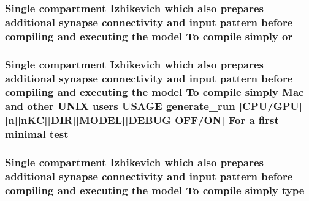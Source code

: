 \hypertarget{userproject_2OneComp__project_2README_8txt_ad3dfb6f90a37dd568d9e93856bbd2b79}{
\subsubsection[{or}]{\setlength{\rightskip}{0pt plus 5cm}Single compartment Izhikevich which also prepares additional synapse connectivity and input pattern before compiling and executing the {\bf model} To compile simply or}}\label{userproject_2OneComp__project_2README_8txt_ad3dfb6f90a37dd568d9e93856bbd2b79}
\hypertarget{userproject_2OneComp__project_2README_8txt_aea3d559e4d6fbbcd1723e4b488214567}{
\subsubsection[{test}]{\setlength{\rightskip}{0pt plus 5cm}Single compartment Izhikevich which also prepares additional synapse connectivity and input pattern before compiling and executing the {\bf model} To compile simply Mac and other U\+N\+I\+X users U\+S\+A\+G\+E {\bf generate\+\_\+run} \mbox{[}{\bf C\+P\+U}/{\bf G\+P\+U}\mbox{]}\mbox{[}n\mbox{]}\mbox{[}n\+K\+C\mbox{]}\mbox{[}D\+I\+R\mbox{]}\mbox{[}M\+O\+D\+E\+L\mbox{]}\mbox{[}D\+E\+B\+U\+G O\+F\+F/O\+N\mbox{]} For a first minimal test}}\label{userproject_2OneComp__project_2README_8txt_aea3d559e4d6fbbcd1723e4b488214567}
\hypertarget{userproject_2OneComp__project_2README_8txt_af296ec059814f76305adc5b27e99faf1}{
\subsubsection[{type}]{\setlength{\rightskip}{0pt plus 5cm}Single compartment Izhikevich which also prepares additional synapse connectivity and input pattern before compiling and executing the {\bf model} To compile simply type}}\label{userproject_2OneComp__project_2README_8txt_af296ec059814f76305adc5b27e99faf1}
